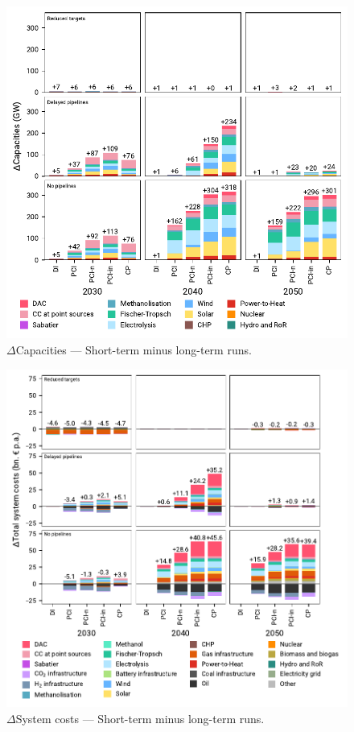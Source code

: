 \documentclass[final,5p,times,twocolumn,sort&compress]{elsarticle}
\begin{document}
\begin{figure}[htbp]
  \centering
  \includegraphics[width=\linewidth]{capacities_overview_extended.pdf}
  \caption{$\Delta$Capacities --- Short-term minus long-term runs.}
  \label{fig:capacities_overview_extended}
\end{figure}


\begin{figure}[htbp]
  \centering
  \includegraphics[width=\linewidth]{costs_overview_extended.pdf}
  \caption{$\Delta$System costs --- Short-term minus long-term runs.}
  \label{fig:costs_overview_extended}
\end{figure}
\end{document}
